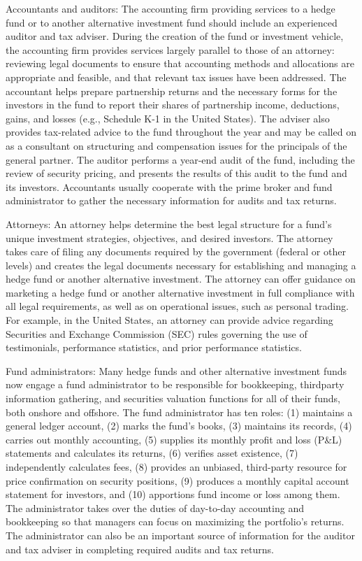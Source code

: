 \documentclass[11pt]{article}
\begin{document}
Accountants and auditors: The accounting firm providing services to a hedge fund or to another alternative investment fund should include an experienced auditor and tax adviser. During the creation of the fund or investment vehicle, the accounting firm provides services largely parallel to those of an attorney: reviewing legal documents to ensure that accounting methods and allocations are appropriate and feasible, and that relevant tax issues have been addressed. The accountant helps prepare partnership returns and the necessary forms for the investors in the fund to report their shares of partnership income, deductions, gains, and losses (e.g., Schedule K-1 in the United States). The adviser also provides tax-related advice to the fund throughout the year and may be called on as a consultant on structuring and compensation issues for the principals of the general partner. The auditor performs a year-end audit of the fund, including the review of security pricing, and presents the results of this audit to the fund and its investors. Accountants usually cooperate with the prime broker and fund administrator to gather the necessary information for audits and tax returns.

Attorneys: An attorney helps determine the best legal structure for a fund's unique investment strategies, objectives, and desired investors. The attorney takes care of filing any documents required by the government (federal or other levels) and creates the legal documents necessary for establishing and managing a hedge fund or another alternative investment. The attorney can offer guidance on marketing a hedge fund or another alternative investment in full compliance with all legal requirements, as well as on operational issues, such as personal trading. For example, in the United States, an attorney can provide advice regarding Securities and Exchange Commission (SEC) rules governing the use of testimonials, performance statistics, and prior performance statistics.

Fund administrators: Many hedge funds and other alternative investment funds now engage a fund administrator to be responsible for bookkeeping, thirdparty information gathering, and securities valuation functions for all of their funds, both onshore and offshore. The fund administrator has ten roles: (1) maintains a general ledger account, (2) marks the fund's books, (3) maintains its records, (4) carries out monthly accounting, (5) supplies its monthly profit and loss (P\&L) statements and calculates its returns, (6) verifies asset existence, (7) independently calculates fees, (8) provides an unbiased, third-party resource for price confirmation on security positions, (9) produces a monthly capital account statement for investors, and (10) apportions fund income or loss among them. The administrator takes over the duties of day-to-day accounting and bookkeeping so that managers can focus on maximizing the portfolio's returns. The administrator can also be an important source of information for the auditor and tax adviser in completing required audits and tax returns.
\end{document}
